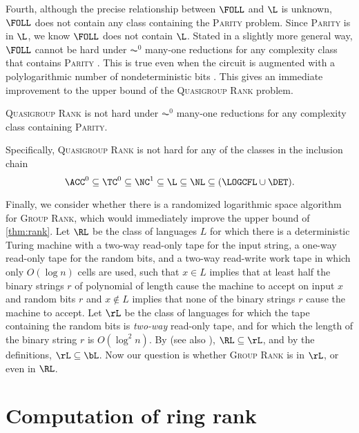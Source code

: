 \documentclass{article}
\begin{document}
Fourth, although the precise relationship between $\FOLL$ and $\L$ is unknown, $\FOLL$ does not contain any class containing the \textsc{Parity} problem.
Since \textsc{Parity} is in $\L$, we know $\FOLL$ does not contain $\L$.
Stated in a slightly more general way, $\FOLL$ cannot be hard under $\AC^0$ many-one reductions for any complexity class that contains \textsc{Parity} \cite[Proposition~2.1]{bklm01}.
This is true even when the circuit is augmented with a polylogarithmic number of nondeterministic bits \cite[Section~4]{ctw13}.
This gives an immediate improvement to the upper bound of the \textsc{Quasigroup Rank} problem.

\begin{theorem}
  \textsc{Quasigroup Rank} is not hard under $\AC^0$ many-one reductions for any complexity class containing \textsc{Parity}.
\end{theorem}

Specifically, \textsc{Quasigroup Rank} is not hard for any of the classes in the inclusion chain
\begin{equation*}
  \ACC^0 \subseteq \TC^0 \subseteq \NC^1 \subseteq \L \subseteq \NL \subseteq (\LOGCFL \cup \DET).
\end{equation*}

Finally, we consider whether there is a randomized logarithmic space algorithm for \textsc{Group Rank}, which would immediately improve the upper bound of \autoref{thm:rank}.
Let $\RL$ be the class of languages $L$ for which there is a deterministic Turing machine with a two-way read-only tape for the input string, a one-way read-only tape for the random bits, and a two-way read-write work tape in which only $O(\log n)$ cells are used, such that $x \in L$ implies that at least half the binary strings $r$ of polynomial of length cause the machine to accept on input $x$ and random bits $r$ and $x \notin L$ implies that none of the binary strings $r$ cause the machine to accept.
Let $\rL$ be the class of languages for which the tape containing the random bits is \emph{two-way} read-only tape, and for which the length of the binary string $r$ is $O(\log^2 n)$.
By \autocite[Corollary~1]{nisan92} (see also \autocite{nisan90}), $\RL \subseteq \rL$, and by the definitions, $\rL \subseteq \bL$.
Now our question is whether \textsc{Group Rank} is in $\rL$, or even in $\RL$.

\section{Computation of ring rank}
\end{document}

